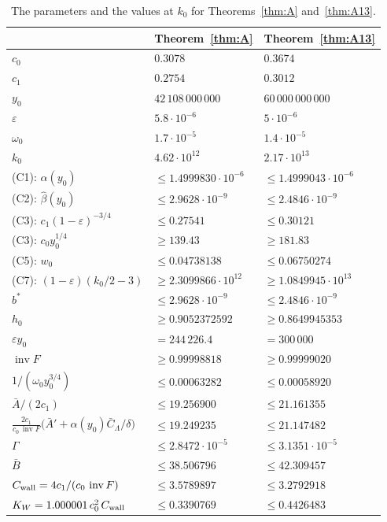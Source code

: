 \documentclass[11pt]{amsart}
\newcommand{\eps}{\varepsilon}
\newcommand{\invF}{\operatorname{inv}F}
\newcommand{\Lam}{\Lambda}
\theoremstyle{definition}
\theoremstyle{remark}
\numberwithin{equation}{section}
\begin{document}
\begin{table}[ht]
\centering
\caption{The parameters and the values at $k_0$ for Theorems~\ref{thm:A} and~\ref{thm:A13}.}\label{tab:const-main}
\small
\begin{tabular}{|l|l|l|}
\hline
 & Theorem~\ref{thm:A} & Theorem~\ref{thm:A13}\\
\hline
$c_0$ & $0.3078$ & $0.3674$\\
$c_1$ & $0.2754$ & $0.3012$\\
$y_0$ & $42\,108\,000\,000$ & $60\,000\,000\,000$\\
$\eps$ & $5.8\cdot10^{-6}$ & $5\cdot10^{-6}$\\
$\omega_0$ & $1.7\cdot10^{-5}$ & $1.4\cdot10^{-5}$\\
$k_0$ & $4.62\cdot10^{12}$ & $2.17\cdot10^{13}$\\
\hline
(C1): $\alpha(y_0)$ & $\le1.4999830\cdot10^{-6}$ & $\le1.4999043\cdot10^{-6}$\\
(C2): $\hat\beta(y_0)$ & $\le2.9628\cdot10^{-9}$ & $\le2.4846\cdot10^{-9}$\\
(C3): $c_1(1-\eps)^{-3/4}$ & $\le0.27541$ & $\le0.30121$\\
(C3): $c_0y_0^{1/4}$ & $\ge139.43$ & $\ge181.83$\\
(C5): $w_0$ & $\le0.04738138$ & $\le0.06750274$\\
(C7): $(1-\eps)(k_0/2-3)$ & $\ge2.3099866\cdot10^{12}$ & $\ge1.0849945\cdot10^{13}$\\
$b^*$ & $\le2.9628\cdot10^{-9}$ & $\le2.4846\cdot10^{-9}$\\
$h_0$ & $\ge0.9052372592$ & $\ge0.8649945353$\\
$\eps y_0$ & $=244\,226.4$ & $=300\,000$\\
$\invF$ & $\ge0.99998818$ & $\ge0.99999020$\\
\hline
$1/(\omega_0y_0^{3/4})$ & $\le0.00063282$ & $\le0.00058920$\\
$\bar A/(2c_1)$ & $\le19.256900$ & $\le21.161355$\\
$\frac{2c_1}{c_0\,\invF}\big(\bar A'+\alpha(y_0)\bar C_\Lam/\delta\big)$ & $\le19.249235$ & $\le21.147482$\\
$\Gamma$ & $\le2.8472\cdot10^{-5}$ & $\le3.1351\cdot10^{-5}$\\
$\bar B$ & $\le38.506796$ & $\le42.309457$\\
$C_{\rm wall}=4c_1/(c_0\,\invF)$ & $\le3.5789897$ & $\le3.2792918$\\
$K_W=1.000001\,c_0^2\,C_{\rm wall}$ & $\le0.3390769$ & $\le0.4426483$\\

\end{tabular}
\end{table}
\end{document}

